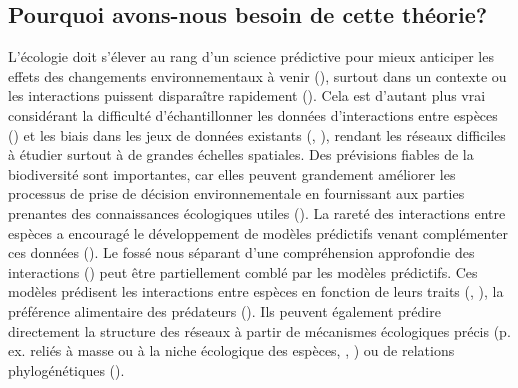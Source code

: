 \subsection{Pourquoi avons-nous besoin de cette théorie?} 

L'écologie doit s'élever au rang d'un science prédictive pour mieux anticiper
les effets des changements environnementaux à venir
(\cite{Evans2012Predictive}), surtout dans un contexte ou les interactions
puissent disparaître rapidement (\cite{Jordano2016Chasing}). Cela est d'autant
plus vrai considérant la difficulté d'échantillonner les données d'interactions
entre espèces (\cite{Jordano2016Sampling}) et les biais dans les jeux de données
existants (\cite{Aguiar2019Revealing}, \cite{Poisot2021Global}), rendant les
réseaux difficiles à étudier surtout à de grandes échelles spatiales. Des
prévisions fiables de la biodiversité sont importantes, car elles peuvent
grandement améliorer les processus de prise de décision environnementale en
fournissant aux parties prenantes des connaissances écologiques utiles
(\cite{Clark2001Ecological}). La rareté des interactions entre espèces a
encouragé le développement de modèles prédictifs venant complémenter ces données
(\cite{Strydom2021Roadmapa}). Le fossé nous séparant d'une compréhension
approfondie des interactions (\cite{Hortal2015Seven}) peut être partiellement
comblé par les modèles prédictifs. Ces modèles prédisent les interactions entre
espèces en fonction de leurs traits (\cite{Caron2024Traitmatching},
\cite{Pichler2020Machine}), la préférence alimentaire des prédateurs
(\cite{Desjardins-Proulx2017Ecological}). Ils peuvent également prédire
directement la structure des réseaux à partir de mécanismes écologiques précis
(p. ex. reliés à masse ou à la niche écologique des espèces, \cite{Cohen1997Stochastic},
\cite{Williams2000Simple}) ou de relations phylogénétiques
(\cite{Strydom2022Food}). 

